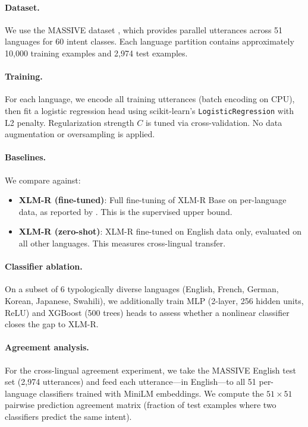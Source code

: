 \documentclass[11pt]{article}
\begin{document}
\paragraph{Dataset.} We use the MASSIVE dataset \citep{fitzgerald2023massive}, which provides parallel utterances across 51 languages for 60 intent classes. Each language partition contains approximately 10,000 training examples and 2,974 test examples.

\paragraph{Training.} For each language, we encode all training utterances (batch encoding on CPU), then fit a logistic regression head using scikit-learn's \texttt{LogisticRegression} with L2 penalty. Regularization strength $C$ is tuned via cross-validation. No data augmentation or oversampling is applied.

\paragraph{Baselines.} We compare against:
\begin{itemize}
\item \textbf{XLM-R (fine-tuned)}: Full fine-tuning of XLM-R Base on per-language data, as reported by \citet{fitzgerald2023massive}. This is the supervised upper bound.
\item \textbf{XLM-R (zero-shot)}: XLM-R fine-tuned on English data only, evaluated on all other languages. This measures cross-lingual transfer.
\end{itemize}

\paragraph{Classifier ablation.} On a subset of 6 typologically diverse languages (English, French, German, Korean, Japanese, Swahili), we additionally train MLP (2-layer, 256 hidden units, ReLU) and XGBoost (500 trees) heads to assess whether a nonlinear classifier closes the gap to XLM-R.

\paragraph{Agreement analysis.} For the cross-lingual agreement experiment, we take the MASSIVE English test set (2,974 utterances) and feed each utterance---in English---to all 51 per-language classifiers trained with MiniLM embeddings. We compute the $51 \times 51$ pairwise prediction agreement matrix (fraction of test examples where two classifiers predict the same intent).
\end{document}
